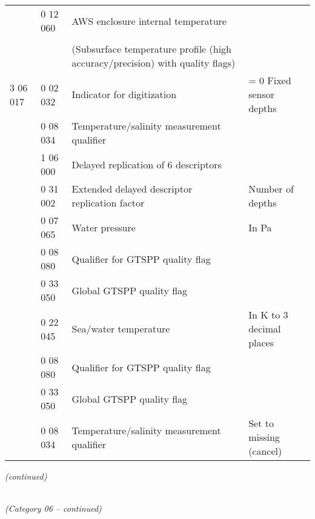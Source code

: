 \begin{longtable}[]{@{}llll@{}}
& 0 12 060 & AWS enclosure internal temperature &\tabularnewline
& & &\tabularnewline
& & (Subsurface temperature profile (high accuracy/precision) with quality flags) &\tabularnewline
3 06 017 & 0 02 032 & Indicator for digitization & = 0 Fixed sensor depths\tabularnewline
& 0 08 034 & Temperature/salinity measurement qualifier &\tabularnewline
& 1 06 000 & Delayed replication of 6 descriptors &\tabularnewline
& 0 31 002 & Extended delayed descriptor replication factor & Number of depths\tabularnewline
& 0 07 065 & Water pressure & In Pa\tabularnewline
& 0 08 080 & Qualifier for GTSPP quality flag &\tabularnewline
& 0 33 050 & Global GTSPP quality flag &\tabularnewline
& 0 22 045 & Sea/water temperature & In K to 3 decimal places\tabularnewline
& 0 08 080 & Qualifier for GTSPP quality flag &\tabularnewline
& 0 33 050 & Global GTSPP quality flag &\tabularnewline
& 0 08 034 & Temperature/salinity measurement qualifier & Set to missing (cancel)\tabularnewline
\bottomrule
\end{longtable}

\emph{(continued)}

\emph{\\
(Category 06 -- continued)}

